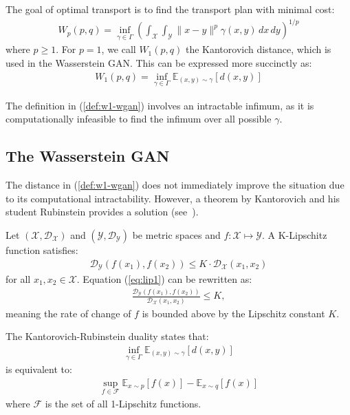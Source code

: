 The goal of optimal transport is to find the transport plan with minimal cost:
\begin{align}%
	\label{eq:min-work}
	W_p(p, q) = \inf_{\gamma \in \Gamma} \left( \int_{\mathcal{X}}\int_{\mathcal{Y}}\|x-y\|^p\gamma(x, y)\,dx\,dy \right)^{1/p}
\end{align}
where $p \geq 1$. For $p = 1$, we call $W_1(p, q)$ the Kantorovich distance, which is used in the Wasserstein GAN. This can be expressed more succinctly as:
\begin{align}
	\label{def:w1-wgan}
	W_1(p, q) = \inf_{\gamma \in \Gamma}\mathbb{E}_{(x,y) \sim \gamma}
	\left[ d(x, y) \right]
\end{align}

\begin{remark}
	The definition in (\ref{def:w1-wgan}) involves an intractable infimum, as it is computationally infeasible to find the infimum over all possible $\gamma$.
\end{remark}

\subsection{The Wasserstein GAN}

The distance in (\ref{def:w1-wgan}) does not immediately improve the situation due to its computational intractability. However, a theorem by Kantorovich and his student Rubinstein provides a solution (see~\cite{ref:kantorovich-rubinstein-1958}).

\begin{definition}
	Let $(\mathcal{X}, \mathcal{D}_\mathcal{X})$ and $(\mathcal{Y}, \mathcal{D}_\mathcal{Y})$ be metric spaces and $f: \mathcal{X}
		\mapsto \mathcal{Y}$. A \textnormal{\sffamily K-Lipschitz} function satisfies:
	\begin{align}
		\label{eq:lip1}
		\mathcal{D}_{\mathcal{Y}}(f(x_1), f(x_2)) \leq K \cdot \mathcal{D}_{\mathcal{X}}(x_1, x_2)
	\end{align}
	for all $x_1, x_2 \in \mathcal{X}$. Equation (\ref{eq:lip1}) can be rewritten as:
	\begin{align}
		\frac{\mathcal{D}_{\mathcal{Y}}(f(x_1), f(x_2))}{\mathcal{D}_{\mathcal{X}}(x_1, x_2)} \leq K,
	\end{align}
	meaning the rate of change of $f$ is bounded above by the Lipschitz constant $K$.
\end{definition}

\begin{theorem}
	The \textnormal{\sffamily Kantorovich-Rubinstein duality} states that:
	\begin{align}
		\inf_{\gamma \in \Gamma}\mathbb{E}_{(x,y) \sim \gamma} \left[d(x, y)\right]
	\end{align}
	is equivalent to:
	\begin{align}
		\sup_{f \in \mathcal{F}} \mathbb{E}_{x \sim p}\left[ f(x) \right] - \mathbb{E}_{x \sim q}\left[ f(x) \right]
	\end{align}
	where $\mathcal{F}$ is the set of all 1-Lipschitz functions.
\end{theorem}

